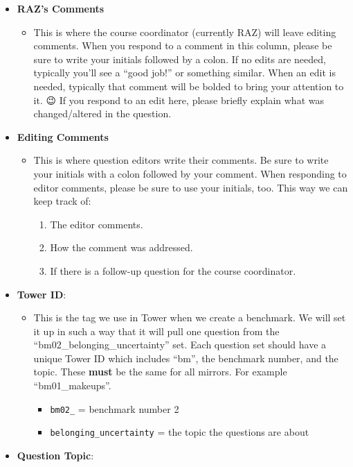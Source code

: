 \documentclass[
]{article}
\providecommand{\tightlist}{%
  \setlength{\itemsep}{0pt}\setlength{\parskip}{0pt}}
\begin{document}
\begin{itemize}
\tightlist
\item
  \textbf{RAZ's Comments}

  \begin{itemize}
  \tightlist
  \item
    This is where the course coordinator (currently RAZ) will leave editing comments. When you respond to a comment in this column, please be sure to write your initials followed by a colon. If no edits are needed, typically you'll see a ``good job!'' or something similar. When an edit is needed, typically that comment will be bolded to bring your attention to it. 😉 If you respond to an edit here, please briefly explain what was changed/altered in the question.
  \end{itemize}
\item
  \textbf{Editing Comments}

  \begin{itemize}
  \tightlist
  \item
    This is where question editors write their comments. Be sure to write your initials with a colon followed by your comment. When responding to editor comments, please be sure to use your initials, too. This way we can keep track of:

    \begin{enumerate}
    \def\labelenumi{\arabic{enumi}.}
    \tightlist
    \item
      The editor comments.
    \item
      How the comment was addressed.
    \item
      If there is a follow-up question for the course coordinator.
    \end{enumerate}
  \end{itemize}
\item
  \textbf{Tower ID}:

  \begin{itemize}
  \tightlist
  \item
    This is the tag we use in Tower when we create a benchmark. We will set it up in such a way that it will pull one question from the ``bm02\_belonging\_uncertainty'' set. Each question set should have a unique Tower ID which includes ``bm'', the benchmark number, and the topic. These \textbf{must} be the same for all mirrors. For example ``bm01\_makeups''.

    \begin{itemize}
    \tightlist
    \item
      \texttt{bm02\_} = benchmark number 2
    \item
      \texttt{belonging\_uncertainty} = the topic the questions are about
    \end{itemize}
  \end{itemize}
\item
  \textbf{Question Topic}:


\end{itemize}
\end{document}

